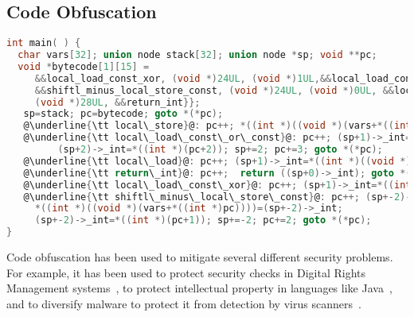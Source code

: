 \subsection{Code Obfuscation}
\begin{figure*}
\begin{lstlisting}[mathescape=false,language=C,basicstyle=\footnotesize,escapechar=@]
int main( ) { 
  char vars[32]; union node stack[32]; union node *sp; void **pc;
  void *bytecode[1][15] =
     &&local_load_const_xor, (void *)24UL, (void *)1UL,&&local_load_const_or_const,(void *)24UL, (void *)1UL, (void *)1UL, 
     &&shiftl_minus_local_store_const, (void *)24UL, (void *)0UL, &&local_store, (void *)28UL,  &&local_load, 
     (void *)28UL, &&return_int}};
   sp=stack; pc=bytecode; goto *(*pc);
   @\underline{\tt local\_store}@: pc++; *((int *)((void *)(vars+*((int *)pc))))=(sp+0)->_int; sp--; pc++; goto *(*pc);
   @\underline{\tt local\_load\_const\_or\_const}@: pc++; (sp+1)->_int=*((int *)((void *)(vars+*((int *)pc))))|*((int *)(pc+1));
         (sp+2)->_int=*((int *)(pc+2)); sp+=2; pc+=3; goto *(*pc);
   @\underline{\tt local\_load}@: pc++; (sp+1)->_int=*((int *)((void *)(vars+*((int *)pc)))); sp++; pc++; goto *(*pc);
   @\underline{\tt return\_int}@: pc++;  return ((sp+0)->_int); goto *(*pc);
   @\underline{\tt local\_load\_const\_xor}@: pc++; (sp+1)->_int=*((int *)((void *)(vars+*((int *)pc))))^*((int *)(pc+1)); sp++; pc+=2; goto *(*pc);
   @\underline{\tt shiftl\_minus\_local\_store\_const}@: pc++; (sp+-2)->_int=((sp+-1)->_int<<(sp+0)->_int)-(sp+-2)->_int;
     *((int *)((void *)(vars+*((int *)pc))))=(sp+-2)->_int; 
     (sp+-2)->_int=*((int *)(pc+1)); sp+=-2; pc+=2; goto *(*pc);
}
\end{lstlisting}
\caption{The program {\tt int main()\{int x++;\}} obfuscated by Tigress, using first the {\tt EncodeArithmetic} transformation (which turns {\tt x++} into {\tt x = ((x|1)<<1)-(x\^{}1))} followed by the {\tt Virtualize} transformation.}
\label{fig:virtualize}
\end{figure*}

Code obfuscation has been used to mitigate several different security problems. For example, it has been used to protect security checks in Digital Rights Management systems~\cite{horning05softwarea,chow02white-box}, to protect intellectual property in languages like Java~\cite{collberg1997taxonomy}, and to diversify malware to protect it from detection by virus scanners~\cite{Skulason92mutation}. 

